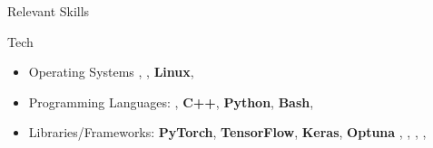 \begin{cvsection}{Relevant Skills}
   \begin{cvsubsection}{Tech}{}{}	
        \begin{itemize}
            \item Operating Systems
            ,
            ,
            \textbf{Linux},
            \item Programming Languages: 
            , 
            \textbf{C++},
            \textbf{Python},
            \textbf{Bash},
            \item Libraries/Frameworks: 
            \textbf{PyTorch},
            \textbf{TensorFlow},
            \textbf{Keras},
            \textbf{Optuna}
            ,
            ,
            ,
            ,


\end{itemize}
\end{cvsubsection}
\end{cvsection}
